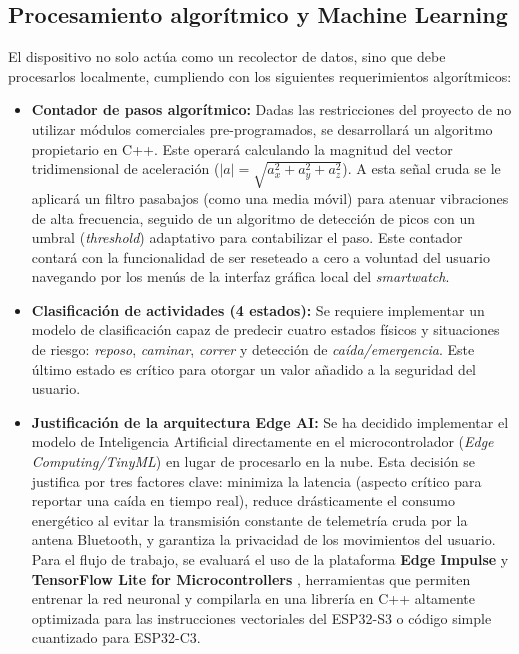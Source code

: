 \documentclass[letterpaper,11pt]{article}
\begin{document}
\subsection{Procesamiento algorítmico y Machine Learning}
El dispositivo no solo actúa como un recolector de datos, sino que debe procesarlos localmente, cumpliendo con los siguientes requerimientos algorítmicos:
\begin{itemize}
    \item \textbf{Contador de pasos algorítmico:} Dadas las restricciones del proyecto de no utilizar módulos comerciales pre-programados, se desarrollará un algoritmo propietario en C++. Este operará calculando la magnitud del vector tridimensional de aceleración ($|a| = \sqrt{a_x^2 + a_y^2 + a_z^2}$). A esta señal cruda se le aplicará un filtro pasabajos (como una media móvil) para atenuar vibraciones de alta frecuencia, seguido de un algoritmo de detección de picos con un umbral (\textit{threshold}) adaptativo para contabilizar el paso. Este contador contará con la funcionalidad de ser reseteado a cero a voluntad del usuario navegando por los menús de la interfaz gráfica local del \textit{smartwatch}.

    \item \textbf{Clasificación de actividades (4 estados):} Se requiere implementar un modelo de clasificación capaz de predecir cuatro estados físicos y situaciones de riesgo: \textit{reposo}, \textit{caminar}, \textit{correr} y detección de \textit{caída/emergencia}. Este último estado es crítico para otorgar un valor añadido a la seguridad del usuario.

    \item \textbf{Justificación de la arquitectura Edge AI:} Se ha decidido implementar el modelo de Inteligencia Artificial directamente en el microcontrolador (\textit{Edge Computing/TinyML}) en lugar de procesarlo en la nube. Esta decisión se justifica por tres factores clave: minimiza la latencia (aspecto crítico para reportar una caída en tiempo real), reduce drásticamente el consumo energético al evitar la transmisión constante de telemetría cruda por la antena Bluetooth, y garantiza la privacidad de los movimientos del usuario. Para el flujo de trabajo, se evaluará el uso de la plataforma \textbf{Edge Impulse} \citep{edge_impulse} y \textbf{TensorFlow Lite for Microcontrollers} \citep{tflite_micro}, herramientas que permiten entrenar la red neuronal y compilarla en una librería en C++ altamente optimizada para las instrucciones vectoriales del ESP32-S3 o código simple cuantizado para ESP32-C3.
\end{itemize}
\end{document}
